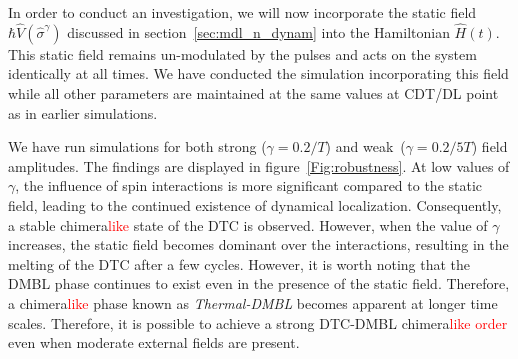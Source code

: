 \documentclass[12pt]{iopart}
\newcommand{\red}[1]{\textcolor{red}{#1}}
\begin{document}
In order to conduct an investigation, we will now incorporate the static field $\hbar\hat{V}(\hat{\sigma}^{\gamma})$ discussed in section~\ref{sec:mdl_n_dynam} into the Hamiltonian $\hat{H}(t)$. This static field remains un-modulated by the pulses and acts on the system identically at all times. We have conducted the simulation incorporating this field while all other parameters are maintained at the same values at CDT/DL point as in earlier simulations. 

We have run simulations for both strong ($\gamma=0.2/T$) and weak ($ \gamma= 0.2/5T$) field amplitudes. The findings are displayed in figure~\ref{Fig:robustness}. At low values of $\gamma$, the influence of spin interactions is more significant compared to the static field, leading to the continued existence of dynamical localization. Consequently, a stable chimera\red{like} state of the DTC is observed. However, when the value of $\gamma$ increases, the static field becomes dominant over the interactions, resulting in the melting of the DTC after a few cycles. However, it is worth noting that the DMBL phase continues to exist even in the presence of the static field. Therefore, a chimera\red{like} phase known as \textit{Thermal-DMBL} becomes apparent at longer time scales. Therefore, it is possible to achieve a strong DTC-DMBL chimera\red{like order} even when moderate external fields are present.
	
\end{document}

